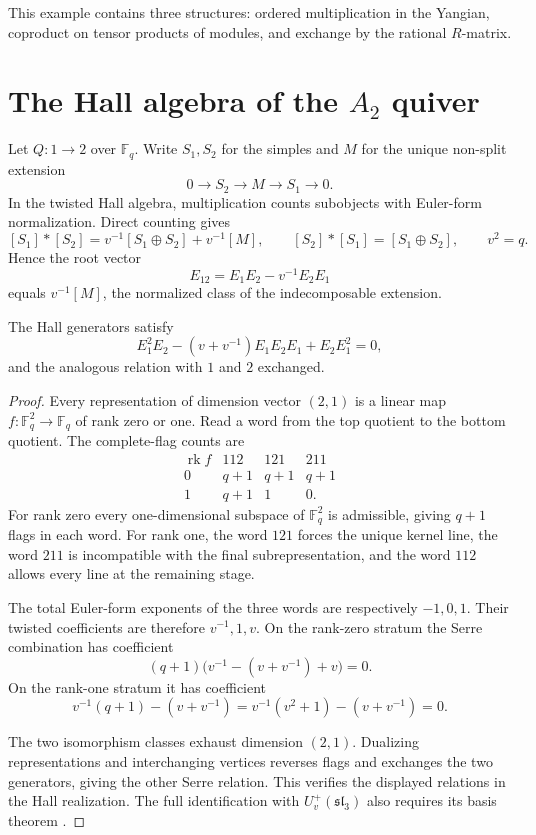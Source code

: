 This example contains three structures: ordered multiplication in the Yangian, coproduct on tensor products of modules, and exchange by the rational $R$-matrix.

\chapter{The Hall algebra of the \texorpdfstring{$A_2$}{A2} quiver}
Let $Q:1\to2$ over $\mathbb F_q$. Write $S_1,S_2$ for the simples and $M$ for the unique non-split extension
\[
 0\to S_2\to M\to S_1\to0.
\]
In the twisted Hall algebra, multiplication counts subobjects with Euler-form normalization. Direct counting gives
\[
 [S_1]*[S_2]=v^{-1}[S_1\oplus S_2]+v^{-1}[M],
 \qquad
 [S_2]*[S_1]=[S_1\oplus S_2],
 \qquad v^2=q.
\]
Hence the root vector
\[
 E_{12}=E_1E_2-v^{-1}E_2E_1
\]
equals $v^{-1}[M]$, the normalized class of the indecomposable extension.

\begin{theorem}
The Hall generators satisfy
\[
 E_1^2E_2-(v+v^{-1})E_1E_2E_1+E_2E_1^2=0,
\]
and the analogous relation with $1$ and $2$ exchanged.
\end{theorem}
\begin{proof}
Every representation of dimension vector $(2,1)$ is a linear map $f:\mathbb F_q^2\to\mathbb F_q$ of rank zero or one. Read a word from the top quotient to the bottom quotient. The complete-flag counts are
\[
\begin{array}{c|ccc}
\operatorname{rk}f&112&121&211\\ \hline
0&q+1&q+1&q+1\\
1&q+1&1&0.
\end{array}
\]
For rank zero every one-dimensional subspace of $\mathbb F_q^2$ is admissible, giving $q+1$ flags in each word. For rank one, the word $121$ forces the unique kernel line, the word $211$ is incompatible with the final subrepresentation, and the word $112$ allows every line at the remaining stage.

The total Euler-form exponents of the three words are respectively $-1,0,1$. Their twisted coefficients are therefore $v^{-1},1,v$. On the rank-zero stratum the Serre combination has coefficient
\[
 (q+1)\bigl(v^{-1}-(v+v^{-1})+v\bigr)=0.
\]
On the rank-one stratum it has coefficient
\[
 v^{-1}(q+1)-(v+v^{-1})
 =v^{-1}(v^2+1)-(v+v^{-1})=0.
\]

The two isomorphism classes exhaust dimension $(2,1)$.
Dualizing representations and interchanging vertices reverses flags and exchanges the two generators, giving the other Serre relation.
This verifies the displayed relations in the Hall realization. The full identification with $U_v^+(\mathfrak{sl}_3)$ also requires its basis theorem \cite{Ringel,Green}.
\end{proof}

